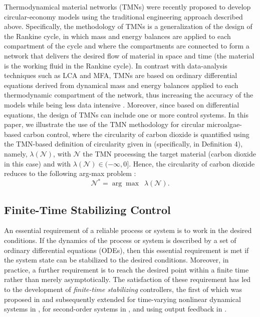 \documentclass[lettersize,journal]{IEEEtran}
\begin{document}
Thermodynamical material networks (TMNs) were recently proposed \cite{zocco2023thermodynamical,zocco2024unification,zocco2022circularity,zocco2024circular} to develop circular-economy models using the traditional engineering approach described above. Specifically, the methodology of TMNs is a generalization of the design of the Rankine cycle, in which mass and energy balances are applied to each compartment of the cycle and where the compartments are connected to form a network that delivers the desired flow of material in space and time (the material is the working fluid in the Rankine cycle). In contrast with data-analysis techniques such as LCA and MFA, TMNs are based on ordinary differential equations derived from dynamical mass and energy balances applied to each thermodynamic compartment of the network, thus increasing the accuracy of the models while being less data intensive \cite{zocco2023thermodynamical,zocco2022circularity}. Moreover, since based on differential equations, the design of TMNs can include one or more control systems. In this paper, we illustrate the use of the TMN methodology for circular microalgae-based carbon control, where the circularity of carbon dioxide is quantified using the TMN-based definition of circularity given in \cite{zocco2024circular} (specifically, in Definition 4), namely, $\lambda(\mathcal{N})$, with $\mathcal{N}$ the TMN processing the target material (carbon dioxide in this case) and with $\lambda(\mathcal{N}) \in (-\infty,0]$. Hence, the circularity of carbon dioxide reduces to the following arg-max problem \cite{zocco2024circular}:
\begin{equation}\label{eq:circProblem}
\mathcal{N}^* = \arg \max \,\,\, \lambda(\mathcal{N}).  
\end{equation}
      
       



\subsection{Finite-Time Stabilizing Control}
An essential requirement of a reliable process or system is to work in the desired conditions. If the dynamics of the process or system is described by a set of ordinary differential equations (ODEs), then this essential requirement is met if the system state can be stabilized to the desired conditions. Moreover, in practice, a further requirement is to reach the desired point within a finite time rather than merely asymptotically. The satisfaction of these requirement has led to the development of \emph{finite-time stabilizing} controllers, the first of which was proposed in \cite{Roxin1966} and subsequently extended for time-varying nonlinear dynamical systems in \cite{moulay2008finite,haddad2008finite}, for second-order systems in \cite{bhat1998continuous}, and using output feedback in \cite{hong2001output}.    
\end{document}
